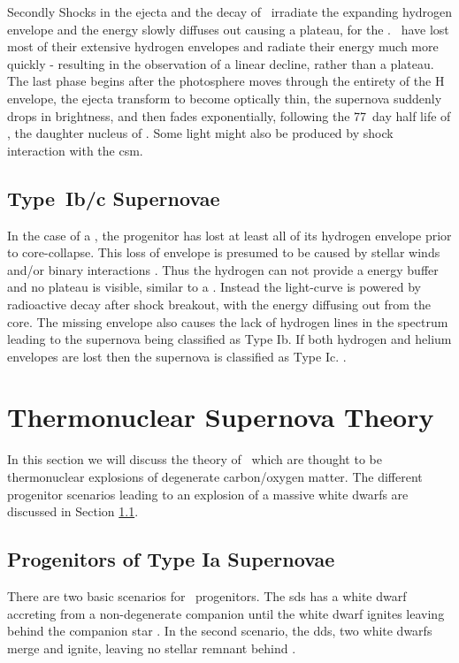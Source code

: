 Secondly Shocks in the ejecta and the decay of \Ni\ irradiate the expanding hydrogen envelope and the energy slowly diffuses out causing a plateau, for the \sneiip. \sniil\ have lost most of their extensive hydrogen envelopes and radiate their energy much more quickly - resulting in the observation of a linear decline, rather than a plateau. The last phase begins after the photosphere moves through the entirety of the H envelope, the ejecta transform to become optically thin, the supernova suddenly drops in brightness, and then fades exponentially, following the 77~day half life of \Co, the daughter nucleus of \Ni. Some light might also be produced by shock interaction with the \gls{csm}.

\subsection{Type~Ib/c Supernovae}

In the case of a \snibc, the progenitor has lost at least all of its hydrogen envelope prior to core-collapse. This loss of envelope is presumed to be caused by stellar winds and/or binary interactions \citep{1992ApJ...391..246P}. Thus the hydrogen can not provide a energy buffer and no plateau is visible, similar to a \sniil. Instead the light-curve is powered by radioactive decay after shock breakout, with the energy diffusing out from the core. The missing envelope also causes the lack of hydrogen lines in the spectrum leading to the supernova being classified as Type Ib. If both hydrogen and helium envelopes are lost then the supernova is classified as Type Ic. 
. 


\section{Thermonuclear Supernova Theory}
In this section we will discuss the theory of \sneia\ which are thought to be thermonuclear explosions of degenerate carbon/oxygen matter. The different progenitor scenarios leading to an explosion of a massive white dwarfs are discussed in Section \ref{sec:snia_progenitor}.



\subsection{Progenitors of Type Ia Supernovae}
\label{sec:snia_progenitor}

There are two basic scenarios for \sneia\ progenitors. The \gls{sds} has a white dwarf accreting from a non-degenerate companion until the white dwarf ignites leaving behind the companion star \citep[first introduced by][]{1973ApJ...186.1007W}. In the second scenario,  the \gls{dds}, two white dwarfs merge and ignite, leaving no stellar remnant behind \citep[first suggested by][]{1984ApJ...277..355W,1984ApJS...54..335I}. 

